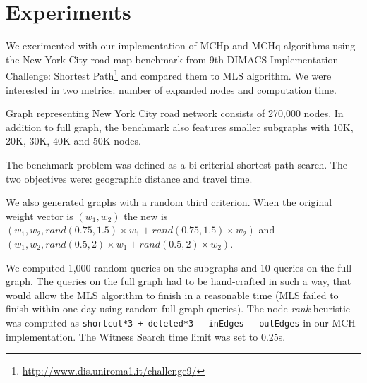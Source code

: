 

\section{Experiments}
\label{secExperiments}

We exerimented with our implementation of MCHp and MCHq algorithms using the New York City road map benchmark from 9th DIMACS Implementation Challenge: Shortest Path\footnote{
\url{http://www.dis.uniroma1.it/challenge9/}} and compared them to MLS algorithm. We were interested in two metrics: number of expanded nodes and computation time.

Graph representing New York City road network consists of 270,000 nodes. In addition to full graph, the benchmark also features smaller subgraphs with 10K, 20K, 30K, 40K and 50K nodes. 

The benchmark problem was defined as a bi-criterial shortest path search. The two objectives were: geographic distance and travel time. 

We also generated graphs with a random third criterion. When the original weight vector is $(w_1,w_2)$ the new is $(w_1,w_2,rand(0.75,1.5) \times w_1 + rand(0.75,1.5) \times w_2)$ and $(w_1,w_2,rand(0.5,2) \times w_1 + rand(0.5,2) \times w_2)$.

We computed 1,000 random queries on the subgraphs and 10 queries on the full graph. %
The queries on the full graph had to be hand-crafted in such a way, that would allow the MLS algorithm to finish in a reasonable time (MLS failed to finish within one day using random full graph queries).  
The node {\em rank} heuristic was computed as {\tt shortcut*3 + deleted*3 -~inEdges -~outEdges} in our MCH implementation. The Witness Search time limit was set to 0.25s. 

